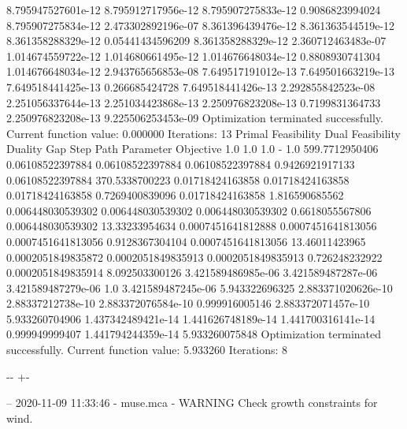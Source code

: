 \documentclass[letterpaper,10pt,english]{sphinxmanual}
\newlength\nbsphinxcodecellspacing
\begin{document}
{\begin{sphinxVerbatim}[commandchars=\\\{\}]
8.795947527601e-12  8.795912717956e-12  8.795907275833e-12  0.9086823994024  8.795907275834e-12  2.473302892196e-07
8.361396439476e-12  8.361363544519e-12  8.361358288329e-12  0.05441434596209 8.361358288329e-12  2.360712463483e-07
1.014674559722e-12  1.014680661495e-12  1.014676648034e-12  0.8808930741304  1.014676648034e-12  2.943765656853e-08
7.649517191012e-13  7.649501663219e-13  7.649518441425e-13  0.266685424728   7.649518441426e-13  2.292855842523e-08
2.251056337644e-13  2.251034423868e-13  2.250976823208e-13  0.7199831364733  2.250976823208e-13  9.225506253453e-09
Optimization terminated successfully.
         Current function value: 0.000000
         Iterations: 13
Primal Feasibility  Dual Feasibility    Duality Gap         Step             Path Parameter      Objective
1.0                 1.0                 1.0                 -                1.0                 599.7712950406
0.06108522397884    0.06108522397884    0.06108522397884    0.9426921917133  0.06108522397884    370.5338700223
0.01718424163858    0.01718424163858    0.01718424163858    0.7269400839096  0.01718424163858    1.816590685562
0.006448030539302   0.006448030539302   0.006448030539302   0.6618055567806  0.006448030539302   13.33233954634
0.0007451641812888  0.0007451641813056  0.0007451641813056  0.9128367304104  0.0007451641813056  13.46011423965
0.0002051849835872  0.0002051849835913  0.0002051849835913  0.726248232922   0.0002051849835914  8.092503300126
3.421589486985e-06  3.421589487287e-06  3.421589487279e-06  1.0              3.421589487245e-06  5.943322696325
2.883371020626e-10  2.88337212738e-10   2.883372076584e-10  0.999916005146   2.883372071457e-10  5.933260704906
1.437342489421e-14  1.441626748189e-14  1.441700316141e-14  0.999949999407   1.441794244359e-14  5.933260075848
Optimization terminated successfully.
         Current function value: 5.933260
         Iterations: 8
\end{sphinxVerbatim}
}

{

\kern-\sphinxverbatimsmallskipamount\kern-\baselineskip
\kern+\FrameHeightAdjust\kern-\fboxrule
\vspace{\nbsphinxcodecellspacing}

\begin{sphinxVerbatim}[commandchars=\\\{\}]
-- 2020-11-09 11:33:46 - muse.mca - WARNING
Check growth constraints for wind.

\end{sphinxVerbatim}
}
\end{document}
